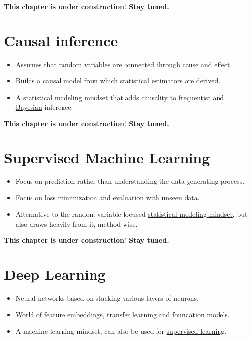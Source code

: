 \documentclass[
  10pt,
]{scrbook}
\providecommand{\tightlist}{%
  \setlength{\itemsep}{0pt}\setlength{\parskip}{0pt}}
\begin{document}
\textbf{This chapter is under construction! Stay tuned.}

\hypertarget{causal}{%
\chapter{Causal inference}\label{causal}}

\begin{itemize}
\tightlist
\item
  Assumes that random variables are connected through cause and effect.
\item
  Builds a causal model from which statistical estimators are derived.
\item
  A \protect\hyperlink{statistical-modeling}{statistical modeling mindset} that adds causality to \protect\hyperlink{frequentism}{frequentist} and \protect\hyperlink{bayesian}{Bayesian} inference.
\end{itemize}

\textbf{This chapter is under construction! Stay tuned.}

\hypertarget{supervised-ml}{%
\chapter{Supervised Machine Learning}\label{supervised-ml}}

\begin{itemize}
\tightlist
\item
  Focus on prediction rather than understanding the data-generating process.
\item
  Focus on loss minimization and evaluation with unseen data.
\item
  Alternative to the random variable focused \protect\hyperlink{statistical-modeling}{statistical modeling mindset}, but also draws heavily from it, method-wise.
\end{itemize}

\textbf{This chapter is under construction! Stay tuned.}

\hypertarget{deep-learning}{%
\chapter{Deep Learning}\label{deep-learning}}

\begin{itemize}
\tightlist
\item
  Neural networks based on stacking various layers of neurons.
\item
  World of feature embeddings, transfer learning and foundation models.
\item
  A machine learning mindset, can also be used for \protect\hyperlink{supervised-ml}{supervised learning}.
\end{itemize}
\end{document}

